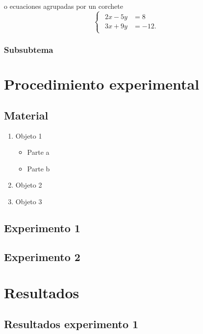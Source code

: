 \documentclass{article}
\begin{document}
o ecuaciones agrupadas por un corchete
\begin{equation}
\begin{cases}
\begin{aligned} 
2x - 5y &=  8 \\ 
3x + 9y &=  -12.
\end{aligned}
\end{cases}
\end{equation}

\subsubsection{Subsubtema }

\section{Procedimiento experimental}

\subsection{Material}

\begin{enumerate}
    \item Objeto 1
    \begin{itemize}
        \item Parte a
        \item Parte b
    \end{itemize}
    \item Objeto 2
    \item Objeto 3
\end{enumerate}

\subsection{Experimento 1}

\subsection{Experimento 2}

\section{Resultados}

\subsection{Resultados experimento 1}
\end{document}
